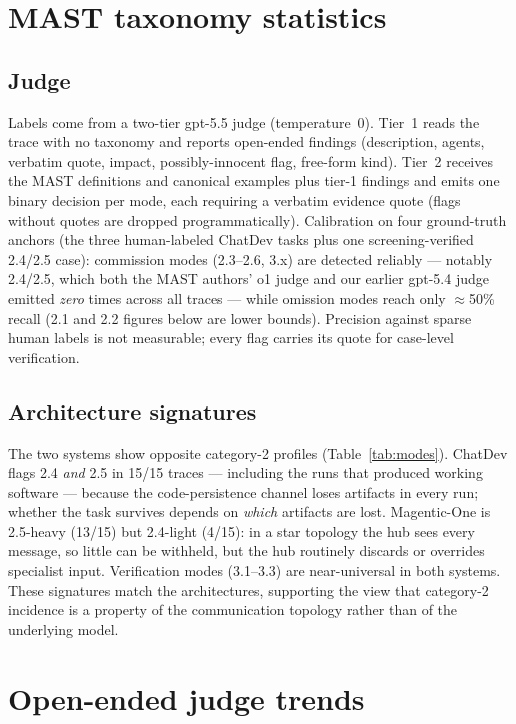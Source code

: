 \documentclass[11pt]{article}
\begin{document}
\section{MAST taxonomy statistics}\label{sec:taxonomy}

\subsection{Judge}
Labels come from a two-tier gpt-5.5 judge (temperature~0). Tier~1 reads the
trace with no taxonomy and reports open-ended findings (description, agents,
verbatim quote, impact, possibly-innocent flag, free-form kind). Tier~2
receives the MAST definitions and canonical examples plus tier-1 findings and
emits one binary decision per mode, each requiring a verbatim evidence quote
(flags without quotes are dropped programmatically). Calibration on four
ground-truth anchors (the three human-labeled ChatDev tasks plus one
screening-verified 2.4/2.5 case): commission modes (2.3--2.6, 3.x) are
detected reliably --- notably 2.4/2.5, which both the MAST authors' o1 judge
and our earlier gpt-5.4 judge emitted \emph{zero} times across all traces ---
while omission modes reach only $\approx$50\% recall (2.1 and 2.2 figures
below are lower bounds). Precision against sparse human labels is not
measurable; every flag carries its quote for case-level verification.



\subsection{Architecture signatures}
The two systems show opposite category-2 profiles
(Table~\ref{tab:modes}). ChatDev flags 2.4 \emph{and} 2.5 in 15/15 traces ---
including the runs that produced working software --- because the
code-persistence channel loses artifacts in every run; whether the task
survives depends on \emph{which} artifacts are lost. Magentic-One is
2.5-heavy (13/15) but 2.4-light (4/15): in a star topology the hub sees
every message, so little can be withheld, but the hub routinely discards or
overrides specialist input. Verification modes (3.1--3.3) are near-universal
in both systems. These signatures match the architectures, supporting the
view that category-2 incidence is a property of the communication topology
rather than of the underlying model.

\section{Open-ended judge trends}\label{sec:trends}
\end{document}
